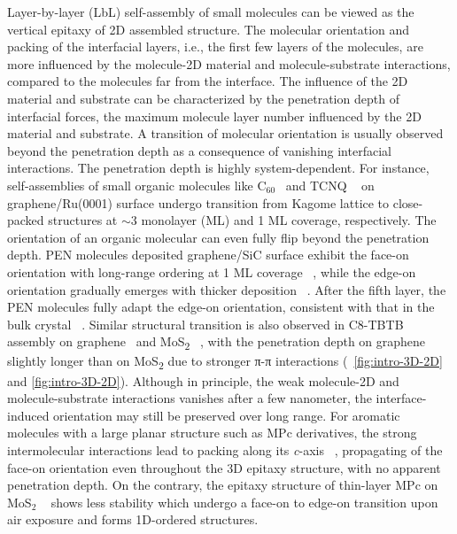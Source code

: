 Layer-by-layer (LbL) self-assembly of small molecules can be viewed as
the vertical epitaxy of 2D assembled structure. The molecular
orientation and packing of the interfacial layers, i.e., the first few
layers of the molecules, are more influenced by the molecule-2D
material and molecule-substrate interactions, compared to the
molecules far from the interface. The influence of the 2D material and
substrate can be characterized by the penetration depth of interfacial forces, \ie the
maximum molecule layer number influenced by the 2D material and
substrate.
%
A transition of
molecular orientation is usually observed beyond the penetration depth
as a consequence of vanishing interfacial interactions.
%
The penetration depth is highly system-dependent.
%
For instance, self-assemblies of small organic molecules like
C\(_{\text{60}}\)~\autocite{Lu_2012_c60_gr_moire} and TCNQ
~\autocite{Maccariello_2014_TCNQ_gr_Ru} on graphene/\allowbreak{}Ru(0001) surface undergo
transition from Kagome lattice to close-packed structures at $\sim$3
monolayer (ML) and 1 ML coverage, respectively.
%
The orientation of an organic molecular can even fully flip beyond the
penetration depth. PEN molecules deposited graphene/SiC surface
exhibit the face-on orientation with long-range ordering at 1 ML
coverage ~\autocite{Jung_2014_pentacene}, while the edge-on orientation
gradually emerges with thicker deposition
~\autocite{Chen_2008_transition_pentacene}. After the fifth layer, the PEN
molecules fully adapt the edge-on orientation, consistent with that in
the bulk crystal ~\autocite{Ruiz_2004_bulk_pentacene}. Similar structural
transition is also observed in C8-TBTB assembly on
graphene~\autocite{He_2014_C8BTBT_gr} and MoS\textsubscript{2}
~\autocite{He_2015_C8BTBT_MoS2}, with the penetration depth on graphene
slightly longer than on MoS\textsubscript{2} due to stronger π-π
interactions (~\autoref{fig:intro-3D-2D} and
\autoref{fig:intro-3D-2D}).
%
Although in principle, the weak molecule-2D and molecule-substrate
interactions vanishes after a few nano\-meter, the interface-induced orientation may still be preserved over long range.
For aromatic molecules with a large planar structure
such as MPc derivatives, the strong intermolecular interactions lead
to packing along its \textit{c}-axis
~\autocite{Ren_2011_DFT_CuPc_epi_gr,Jiang_2014_F16Pc,Yoon_2010_crystal_F16cuPc},
propagating of the face-on orientation even
throughout the 3D epitaxy structure, with no apparent penetration
depth. On the contrary, the epitaxy
structure of thin-layer MPc on MoS\(_{\text{2}}\)
~\autocite{Zhang_2015_CuPc_MoS2} shows less stability which undergo a
face-on to edge-on transition upon air exposure and forms 1D-ordered
structures.

